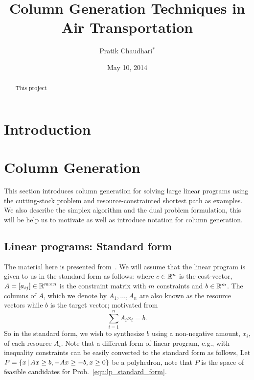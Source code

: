 \documentclass[letterpaper, 10pt, twocolumn, reqno]{amsart}
\title{Column Generation Techniques in Air Transportation}
\author{Pratik Chaudhari$^*$}
\date{May 10, 2014}
\begin{document}
\begin{abstract}
This project
\end{abstract}
\maketitle

\section{Introduction}
\label{sec:intro}

\section{Column Generation}
\label{sec:column_generation}

This section introduces column generation for solving large linear programs using the cutting-stock problem and resource-constrainted shortest path as examples. We also describe the simplex algorithm and the dual problem formulation, this will be help us to motivate as well as introduce notation for column generation.

\subsection{Linear programs: Standard form}
\label{ssec:lp_standard}

The material here is presented from~\cite{bertsimas1997introduction}. We will assume that the linear program is given to us in the standard form as follows:
where $c \in \mathbb{R}^n$ is the cost-vector, $A = [a_{ij}] \in \mathbb{R}^{m \times n}$ is the constraint matrix with $m$ constraints and $b \in \mathbb{R}^m$. The columns of $A$, which we denote by $A_1, \ldots, A_n$ are also known as the resource vectors while $b$ is the target vector; motivated from
$$\sum_{i=1}^n A_i x_i =b.$$
So in the standard form, we wish to synthesize $b$ using a non-negative amount, $x_i$, of each resource $A_i$. Note that a different form of linear program, e.g., with inequality constraints can be easily converted to the standard form as follows,
Let $P = \left\{x \, \vert \, Ax \geq b, -Ax \geq -b, x \geq 0\right\}$ be a polyhedron, note that $P$ is the space of feasible candidates for Prob.~\eqref{eqn:lp_standard_form}.
\end{document}
